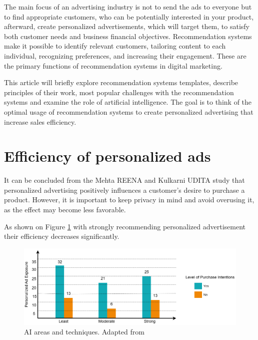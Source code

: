 \documentclass[10pt,twoside,english,a4paper]{article}
\begin{document}
\medskip The main focus of an advertising industry is not to send the ads to everyone but to find appropriate customers, who can be potentially interested in your product, afterward, create personalized advertisements, which will target them, to satisfy both customer needs and business financial objectives. Recommendation systems make it possible to identify relevant customers, tailoring content to each individual, recognizing preferences, and increasing their engagement. These are the primary functions of recommendation systems in digital marketing.

\medskip This article will briefly explore recommendation systems templates, describe principles of their work, most popular challenges with the recommendation systems and examine the role of artificial intelligence. The goal is to think of the optimal usage of recommendation systems to create personalized advertising that increase sales efficiency.

\section{Efficiency of personalized ads}

It can be concluded from the Mehta REENA and Kulkarni UDITA study \cite{mehta2020personalized_ads} that personalized advertising positively influences a customer's desire to purchase a product. However, it is important to keep privacy in mind and avoid overusing it, as the effect may become less favorable.

\medskip As shown on Figure \ref{fig:fig6} with strongly recommending personalized advertisement their efficiency decreases significantly.

\begin{figure}[H]
    \centering
	\includegraphics[width=1\textwidth]{./diagrams/customers but intentions.png}
	\caption{AI areas and techniques. Adapted from \cite{mehta2020personalized_ads}}
	\label{fig:fig6}
\end{figure}
\end{document}
